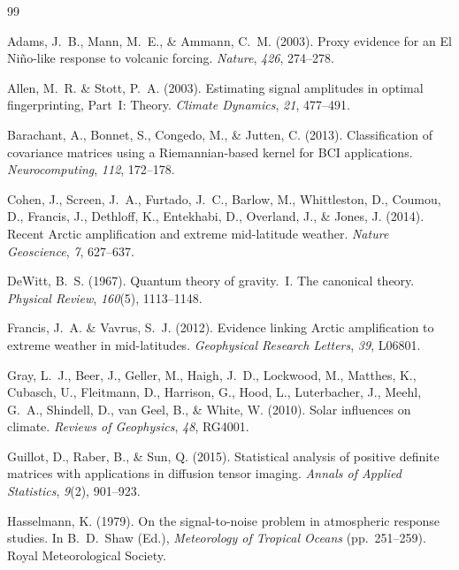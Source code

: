 \documentclass[preprint,12pt]{elsarticle}
\begin{document}
\begin{thebibliography}{99}

Adams, J.~B., Mann, M.~E., \& Ammann, C.~M. (2003).
Proxy evidence for an El Ni\~{n}o-like response to volcanic forcing.
\textit{Nature}, \textit{426}, 274--278.

Allen, M.~R. \& Stott, P.~A. (2003).
Estimating signal amplitudes in optimal fingerprinting, Part~I: Theory.
\textit{Climate Dynamics}, \textit{21}, 477--491.

Barachant, A., Bonnet, S., Congedo, M., \& Jutten, C. (2013).
Classification of covariance matrices using a Riemannian-based kernel for BCI applications.
\textit{Neurocomputing}, \textit{112}, 172--178.

Cohen, J., Screen, J.~A., Furtado, J.~C., Barlow, M., Whittleston, D., Coumou, D., Francis, J., Dethloff, K., Entekhabi, D., Overland, J., \& Jones, J. (2014).
Recent Arctic amplification and extreme mid-latitude weather.
\textit{Nature Geoscience}, \textit{7}, 627--637.

DeWitt, B.~S. (1967).
Quantum theory of gravity.~I. The canonical theory.
\textit{Physical Review}, \textit{160}(5), 1113--1148.

Francis, J.~A. \& Vavrus, S.~J. (2012).
Evidence linking Arctic amplification to extreme weather in mid-latitudes.
\textit{Geophysical Research Letters}, \textit{39}, L06801.

Gray, L.~J., Beer, J., Geller, M., Haigh, J.~D., Lockwood, M., Matthes, K., Cubasch, U., Fleitmann, D., Harrison, G., Hood, L., Luterbacher, J., Meehl, G.~A., Shindell, D., van Geel, B., \& White, W. (2010).
Solar influences on climate.
\textit{Reviews of Geophysics}, \textit{48}, RG4001.

Guillot, D., Raber, B., \& Sun, Q. (2015).
Statistical analysis of positive definite matrices with applications in diffusion tensor imaging.
\textit{Annals of Applied Statistics}, \textit{9}(2), 901--923.

Hasselmann, K. (1979).
On the signal-to-noise problem in atmospheric response studies.
In B.~D.~Shaw (Ed.), \textit{Meteorology of Tropical Oceans} (pp.\ 251--259).
Royal Meteorological Society.


\end{thebibliography}
\end{document}
